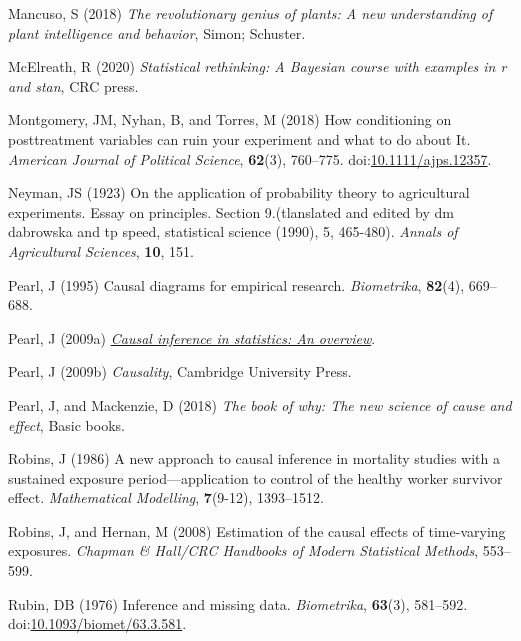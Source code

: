 \documentclass[
  singlecolumn]{article}
\newlength{\cslhangindent}
\newenvironment{CSLReferences}[2] %
 {\begin{list}{}{%
  \setlength{\itemindent}{0pt}
  \setlength{\leftmargin}{0pt}
  \setlength{\parsep}{0pt}
  \ifodd #1
   \setlength{\leftmargin}{\cslhangindent}
   \setlength{\itemindent}{-1\cslhangindent}
  \fi
  \setlength{\itemsep}{#2\baselineskip}}}
 {\end{list}}
\begin{document}
\begin{CSLReferences}{1}{0}
Mancuso, S (2018) \emph{The revolutionary genius of plants: A new
understanding of plant intelligence and behavior}, Simon; Schuster.

McElreath, R (2020) \emph{Statistical rethinking: A {B}ayesian course
with examples in r and stan}, CRC press.

Montgomery, JM, Nyhan, B, and Torres, M (2018) How conditioning on
posttreatment variables can ruin your experiment and what to do about
It. \emph{American Journal of Political Science}, \textbf{62}(3),
760--775.
doi:\href{https://doi.org/10.1111/ajps.12357}{10.1111/ajps.12357}.

Neyman, JS (1923) On the application of probability theory to
agricultural experiments. Essay on principles. Section 9.(tlanslated and
edited by dm dabrowska and tp speed, statistical science (1990), 5,
465-480). \emph{Annals of Agricultural Sciences}, \textbf{10}, 151.

Pearl, J (1995) Causal diagrams for empirical research.
\emph{Biometrika}, \textbf{82}(4), 669--688.

Pearl, J (2009a) \emph{\href{https://doi.org/10.1214/09-SS057}{Causal
inference in statistics: An overview}}.

Pearl, J (2009b) \emph{Causality}, Cambridge University Press.

Pearl, J, and Mackenzie, D (2018) \emph{The book of why: The new science
of cause and effect}, Basic books.

Robins, J (1986) A new approach to causal inference in mortality studies
with a sustained exposure period---application to control of the healthy
worker survivor effect. \emph{Mathematical Modelling}, \textbf{7}(9-12),
1393--1512.

Robins, J, and Hernan, M (2008) Estimation of the causal effects of
time-varying exposures. \emph{Chapman \& Hall/CRC Handbooks of Modern
Statistical Methods}, 553--599.

Rubin, DB (1976) Inference and missing data. \emph{Biometrika},
\textbf{63}(3), 581--592.
doi:\href{https://doi.org/10.1093/biomet/63.3.581}{10.1093/biomet/63.3.581}.


\end{CSLReferences}
\end{document}
